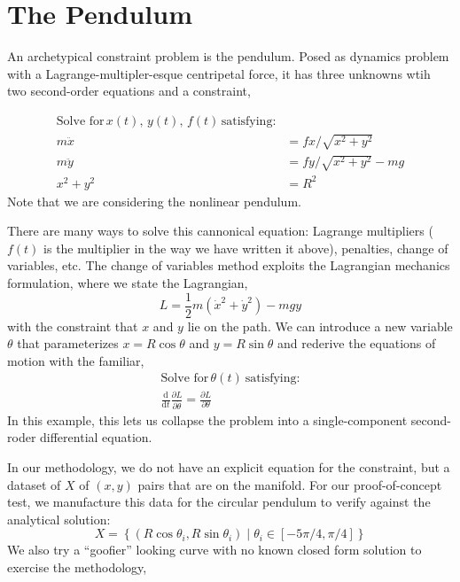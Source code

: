 \documentclass[]{article}
\begin{document}
\hypertarget{header-n3267}{%
\section{The Pendulum}\label{header-n3267}}

An archetypical constraint problem is the pendulum. Posed as dynamics
problem with a Lagrange-multipler-esque centripetal force, it
has three unknowns wtih two second-order equations and a constraint,

\begin{align}
\text{Solve for}\, x(t), \, y(t), \, f(t) \, \text{satisfying:} \\
m \ddot{x} & = f x/\sqrt{x^2+y^2} \\
m \ddot{y} & = f y/\sqrt{x^2+y^2} - m g \\
x^2 + y^2 & = R^2
\end{align}
Note that we are considering the nonlinear pendulum.

There are many ways to solve this cannonical equation: Lagrange
multipliers (\(f(t)\) is the multiplier in the way we have written it
above), penalties, change of variables, etc. The change of variables
method exploits the Lagrangian mechanics formulation, where we state
the Lagrangian,
\begin{equation}
L = \frac{1}{2}m\left(\dot{x}^2 + \dot{y}^2\right) - m g y
\end{equation}
with the constraint that \(x\) and \(y\) lie on the path.
We can introduce a new variable \(\theta\) that parameterizes
\(x=R\cos\theta\) and \(y=R\sin\theta\) and rederive the equations of
motion with the familiar,
\begin{align}
\text{Solve for}\, \theta(t) \ \text{satisfying:} \\
\frac{\mathrm{d}}{\mathrm{d}t} \frac{\partial L}{\partial
  \dot{\theta}} =
  \frac{\partial L}{\partial \theta}
\end{align}
In this example, this lets us collapse the problem into a
single-component second-roder differential equation.

In our methodology, we do not have an explicit equation for the
constraint, but a dataset of $X$ of $(x,y)$ pairs that are on the manifold. For
our proof-of-concept test, we manufacture this data for the circular
pendulum to verify against the analytical solution:
\begin{equation}
X = \left\{ (R\cos\theta_i, R\sin\theta_i)\; | \;\theta_i \in [-5\pi/4,\pi/4] \right\}
\end{equation}
We also try a ``goofier'' looking curve with no known closed form
solution to exercise the methodology,
\end{document}
